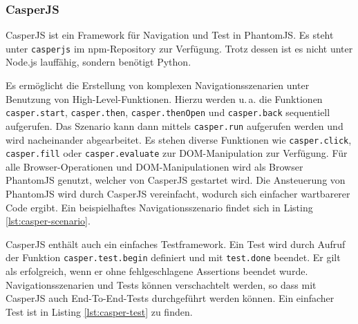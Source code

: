 \subsubsection{CasperJS}
\label{sec:CasperJS}
CasperJS ist ein Framework für Navigation und Test in PhantomJS. Es steht unter \texttt{casperjs} im npm-Repository zur Verfügung.\cite{casperjs-index} Trotz dessen ist es nicht unter Node.js lauffähig\cite{casperjs-faq}, sondern benötigt Python\cite{casperjs-installation}.

Es ermöglicht die Erstellung von komplexen Navigationsszenarien unter Benutzung von High-Level-Funktionen. Hierzu werden u.\,a. die Funktionen \texttt{casper.start}, \texttt{casper.then}, \texttt{casper.thenOpen} und \texttt{casper.back} sequentiell aufgerufen. Das Szenario kann dann mittels \texttt{casper.run} aufgerufen werden und wird nacheinander abgearbeitet. Es stehen diverse Funktionen wie \texttt{casper.click}, \texttt{casper.fill} oder \texttt{casper.evaluate} zur DOM-Manipulation zur Verfügung. Für alle Browser-Operationen und DOM-Manipulationen wird als Browser PhantomJS genutzt, welcher von CasperJS gestartet wird. Die Ansteuerung von PhantomJS wird durch CasperJS vereinfacht, wodurch sich einfacher wartbarerer Code ergibt\cite{casperjs-better-phantomjs}. Ein beispielhaftes Navigationsszenario findet sich in Listing \ref{lst:casper-scenario}.\cite{casperjs-index}

\begin{figure}[H]
	
\end{figure}

CasperJS enthält auch ein einfaches Testframework. Ein Test wird durch Aufruf der Funktion \texttt{casper.test.begin} definiert und mit \texttt{test.done} beendet. Er gilt als erfolgreich, wenn er ohne fehlgeschlagene Assertions beendet wurde. Navigationsszenarien und Tests können verschachtelt werden, so dass mit CasperJS auch End-To-End-Tests durchgeführt werden können.\cite{casperjs-index, casperjs-test} Ein einfacher Test ist in Listing \ref{lst:casper-test} zu finden.

\begin{figure}[H]
	
\end{figure}